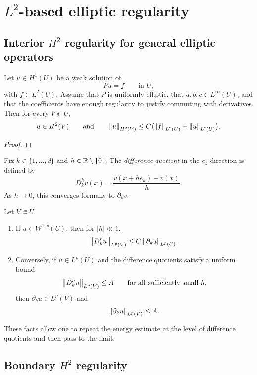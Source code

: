 \section{$L^2$-based elliptic regularity}
\subsection{Interior $H^2$ regularity for general elliptic operators}
\begin{theorem}
Let $u\in H^1(U)$ be a weak solution of
\[
Pu=f
\qquad \text{in }U,
\]
with $f\in L^2(U)$. Assume that $P$ is uniformly elliptic, that $a,b,c\in L^\infty(U)$, and that the coefficients have enough regularity to justify commuting with derivatives. Then for every $V\Subset U$,
\[
u\in H^2(V)
\qquad \text{and} \qquad
\left\lVert u \right\rVert_{H^2(V)} \leq C\bigl(\left\lVert f \right\rVert_{L^2(U)} + \left\lVert u \right\rVert_{L^2(U)}\bigr).
\]
\end{theorem}
\begin{proof}
    
\end{proof}

\begin{definition}
Fix $k\in\{1,\dots,d\}$ and $h\in\mathbb{R}\setminus\{0\}$. The \emph{difference quotient} in the $e_k$ direction is defined by
\[
D_k^h v(x) = \frac{v(x+he_k)-v(x)}{h}.
\]
As $h\to 0$, this converges formally to $\partial_k v$.
\end{definition}

\begin{lemma}
Let $V\Subset U$.
\begin{enumerate}
    \item If $u\in W^{1,p}(U)$, then for $|h|\ll 1$,
    \[
    \left\lVert D_k^h u \right\rVert_{L^p(V)} \leq C\left\lVert \partial_k u \right\rVert_{L^p(U)}.
    \]
    \item Conversely, if $u\in L^p(U)$ and the difference quotients satisfy a uniform bound
    \[
    \left\lVert D_k^h u \right\rVert_{L^p(V)} \leq A
    \qquad \text{for all sufficiently small }h,
    \]
    then $\partial_k u\in L^p(V)$ and
    \[
    \left\lVert \partial_k u \right\rVert_{L^p(V)} \leq A.
    \]
\end{enumerate}
\end{lemma}

These facts allow one to repeat the energy estimate at the level of difference quotients and then pass to the limit.

\subsection{Boundary $H^2$ regularity}

